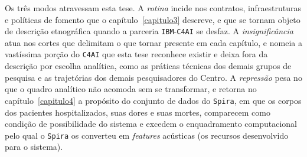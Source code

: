 Os três modos atravessam esta tese. A \textit{rotina} incide nos contratos, infraestruturas e políticas de fomento que o capítulo~\ref{capitulo3} descreve, e que se tornam objeto de descrição etnográfica quando a parceria \texttt{IBM}-\texttt{C4AI} se desfaz. A \textit{insignificância} atua nos cortes que delimitam o que tornar presente em cada capítulo, e nomeia a vastíssima porção do \texttt{C4AI} que esta tese reconhece existir e deixa fora da descrição por escolha analítica, como as práticas técnicas dos demais grupos de pesquisa e as trajetórias dos demais pesquisadores do Centro. A \textit{repressão} pesa no que o quadro analítico não acomoda sem se transformar, e retorna no capítulo~\ref{capitulo4} a propósito do conjunto de dados do \texttt{Spira}, em que os corpos dos pacientes hospitalizados, suas dores e suas mortes, comparecem como condição de possibilidade do sistema e excedem o enquadramento computacional pelo qual o \texttt{Spira} os converteu em \textit{features} acústicas (os recursos desenvolvido para o sistema).

